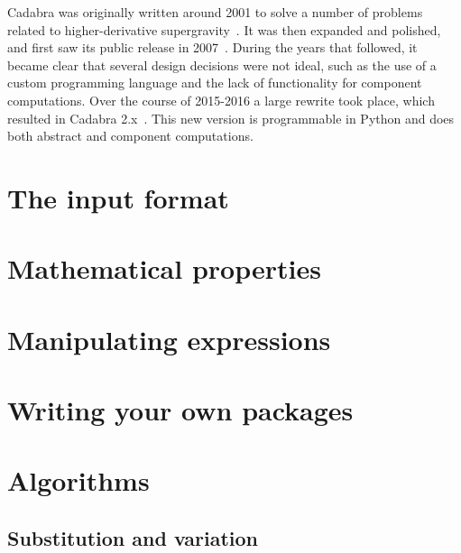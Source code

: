 \documentclass[11pt]{book}
\begin{document}
Cadabra was originally written around 2001 to solve a number of
problems related to higher-derivative
supergravity~\cite{Peeters:2000qj,Peeters:2003pv}. It was then
expanded and polished, and first saw its public release in
2007~\cite{kas_cdb_hep}.  During the years that followed, it became
clear that several design decisions were not ideal, such as the use of
a custom programming language and the lack of functionality for
component computations. Over the course of 2015-2016 a large rewrite
took place, which resulted in Cadabra 2.x~\cite{Peeters:2018dyg}.
This new version is programmable in Python and does both abstract and
component computations.


\chapter{The input format}






\chapter{Mathematical properties}


\chapter{Manipulating expressions}






\chapter{Writing your own packages}



\chapter{Algorithms}

\section{Substitution and variation}
\end{document}
